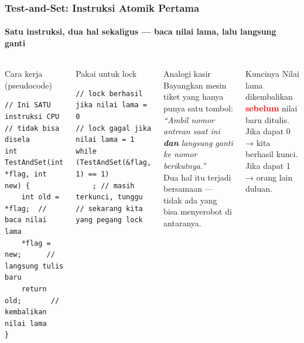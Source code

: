 \documentclass[t,aspectratio=169,xcolor=dvipsnames]{beamer}
\newcommand{\tem}[1]{\textbf{\textcolor{red}{#1}}}
\begin{document}
\begin{frame}[fragile,shrink=10]
    \frametitle{Test-and-Set: Instruksi Atomik Pertama}
    \framesubtitle{Satu instruksi, dua hal sekaligus — baca nilai lama, lalu langsung ganti}
    \small

    \begin{columns}[T]
        \begin{block}{Cara kerja (pseudocode)}
\begin{lstlisting}[basicstyle=\ttfamily\scriptsize]
// Ini SATU instruksi CPU
// tidak bisa disela
int TestAndSet(int *flag, int new) {
    int old = *flag;  // baca nilai lama
    *flag = new;      // langsung tulis baru
    return old;       // kembalikan nilai lama
}
\end{lstlisting}
        \end{block}

        \begin{block}{Pakai untuk lock}
\begin{lstlisting}[basicstyle=\ttfamily\scriptsize]
// lock berhasil jika nilai lama = 0
// lock gagal jika nilai lama = 1
while (TestAndSet(&flag, 1) == 1)
    ; // masih terkunci, tunggu
// sekarang kita yang pegang lock
\end{lstlisting}
        \end{block}

        \begin{exampleblock}{Analogi kasir}
            Bayangkan mesin tiket yang hanya punya satu tombol:\\[0.3em]
            \textit{``Ambil nomor antrean saat ini \textbf{dan} langsung ganti ke nomor berikutnya.''} \\[0.3em]
            Dua hal itu terjadi bersamaan — tidak ada yang bisa menyerobot di antaranya.
        \end{exampleblock}

        \begin{alertblock}{Kuncinya}
            Nilai lama dikembalikan \tem{sebelum} nilai baru ditulis.\\
            Jika dapat 0 → kita berhasil kunci.\\
            Jika dapat 1 → orang lain duluan.
        \end{alertblock}
    \end{columns}
\end{frame}
\end{document}
